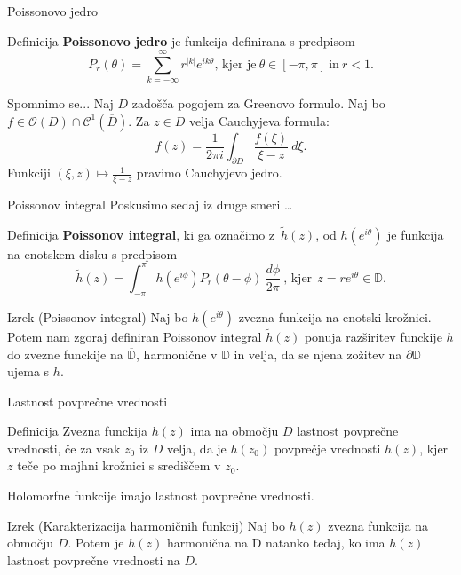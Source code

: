 \documentclass{beamer}
\theoremstyle{definition}
\theoremstyle{definition}
\begin{document}
\begin{frame}{Poissonovo jedro}
   \begin{block}{Definicija}
      \textbf{Poissonovo jedro} je funkcija definirana s predpisom
      $$
         P_r(\theta) = \sum_{k = -\infty}^{\infty}{r^{|k|} e^{i k \theta}}\text{, kjer je}~\theta \in [-\pi, \pi]~\text{in}~ r < 1.
      $$
   \end{block}
   \pause
   \begin{alertblock}{Spomnimo se...}
      Naj $D$ zadošča pogojem za Greenovo formulo. 
      Naj bo $f \in \mathcal{O}(D) \cap \mathcal{C}^1(\overline{D})$. 
      Za $z \in D$ velja Cauchyjeva formula: 
      $$
      f(z) = \frac{1}{2 \pi i} \int_{\partial D}{\frac{f(\xi)}{\xi - z}~d\xi}.
      $$
      \pause
      \newline
      Funkciji 
      $
      (\xi, z) \mapsto \frac{1}{\xi - z}
      $
      pravimo Cauchyjevo jedro.

   \end{alertblock}
\end{frame}

\begin{frame}{Poissonov integral}
   Poskusimo sedaj iz druge smeri \dots

   \begin{block}{Definicija}
      \textbf{Poissonov integral}, ki ga označimo z~$\widetilde{h}(z)$, od $h(e^{i\theta})$ je funkcija na enotskem disku s predpisom
      $$
      \widetilde{h}(z) = \int_{-\pi}^{\pi}{h(e^{i\phi}) P_r(\theta - \phi)~\frac{d\phi}{2 \pi}}~\text{, kjer}~~z = r e^{i\theta} \in \mathbb{D}.
      $$
   \end{block}
   \pause
   \begin{exampleblock}{Izrek (Poissonov integral)}
      Naj bo $h(e^{i \theta})$ zvezna funkcija na enotski krožnici. 
      Potem nam zgoraj definiran Poissonov integral $\widetilde{h}(z)$ ponuja razširitev funckije $h$ do zvezne funckije na $\overline{\mathbb{D}}$, harmonične v $\mathbb{D}$ in velja, da
      se njena zožitev na $\partial \mathbb{D}$ ujema s $h$.
   \end{exampleblock}
\end{frame}

\begin{frame}{Lastnost povprečne vrednosti}
   \begin{block}{Definicija} 
      Zvezna funckija $h(z)$ ima na območju $D$ lastnost povprečne vrednosti, če za vsak $z_0$ iz $D$ velja, 
      da je $h(z_0)$ povprečje vrednosti $h(z)$, kjer $z$ teče po majhni krožnici s središčem v $z_0$.
   \end{block}
   \pause
   Holomorfne funkcije imajo lastnost povprečne vrednosti. 
   \pause
   \begin{exampleblock}{Izrek (Karakterizacija harmoničnih funkcij)}
      Naj bo $h(z)$ zvezna funkcija na območju $D$. 
      Potem je $h(z)$ harmonična na D natanko tedaj, ko ima $h(z)$ lastnost povprečne vrednosti na $D$.
   \end{exampleblock}
\end{frame}
\end{document}
